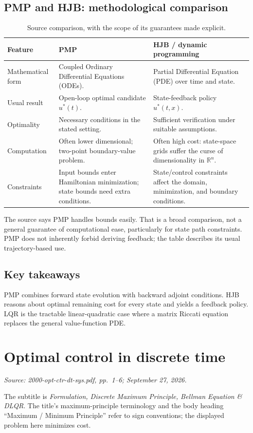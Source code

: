 \documentclass[11pt,a4paper]{article}
\numberwithin{equation}{section}
\numberwithin{figure}{section}
\numberwithin{table}{section}
\newcommand{\source}[1]{\par{\small\color{muted}\textit{Source: #1.}}\par}
\newcommand{\module}[2]{\clearpage\section{#1}\source{#2}}
\newcommand{\R}{\mathbb{R}}
\begin{document}
\subsection{PMP and HJB: methodological comparison}
\begin{table}[htbp]\centering\small
\caption{Source comparison, with the scope of its guarantees made explicit.}
\begin{tabularx}{\textwidth}{@{}P{28mm}YY@{}}\toprule
Feature & PMP & HJB / dynamic programming\\\midrule
Mathematical form & Coupled Ordinary Differential Equations (ODEs). & Partial Differential Equation (PDE) over time and state.\\\addlinespace
Usual result & Open-loop optimal candidate $u^*(t)$. & State-feedback policy $u^*(t,x)$.\\\addlinespace
Optimality & Necessary conditions in the stated setting. & Sufficient verification under suitable assumptions.\\\addlinespace
Computation & Often lower dimensional; two-point boundary-value problem. & Often high cost: state-space grids suffer the curse of dimensionality in $\R^n$.\\\addlinespace
Constraints & Input bounds enter Hamiltonian minimization; state bounds need extra conditions. & State/control constraints affect the domain, minimization, and boundary conditions.\\\bottomrule
\end{tabularx}\end{table}\FloatBarrier
The source says PMP handles bounds easily. That is a broad comparison, not a general guarantee of computational ease, particularly for state path constraints. PMP does not inherently forbid deriving feedback; the table describes its usual trajectory-based use.

\subsection{Key takeaways}
PMP combines forward state evolution with backward adjoint conditions. HJB reasons about optimal remaining cost for every state and yields a feedback policy. LQR is the tractable linear-quadratic case where a matrix Riccati equation replaces the general value-function PDE.

\module{Optimal control in discrete time}{2000-opt-ctr-dt-sys.pdf, pp.\ 1--6; September 27, 2026}
The subtitle is \emph{Formulation, Discrete Maximum Principle, Bellman Equation \& DLQR}. The title's maximum-principle terminology and the body heading ``Maximum / Minimum Principle'' refer to sign conventions; the displayed problem here minimizes cost.
\end{document}
